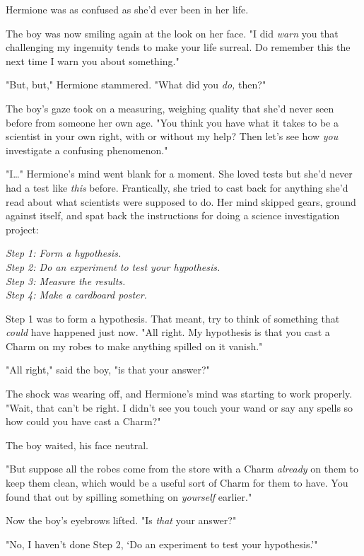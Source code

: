 Hermione was as confused as she'd ever been in her life.

The boy was now smiling again at the look on her face. "I did \emph{warn} you
that challenging my ingenuity tends to make your life surreal. Do remember this
the next time I warn you about something."

"But, but," Hermione stammered. "What did you \emph{do,} then?"

The boy's gaze took on a measuring, weighing quality that she'd never seen
before from someone her own age. "You think you have what it takes to be a
scientist in your own right, with or without my help? Then let's see how
\emph{you} investigate a confusing phenomenon."

"I{\ldots}" Hermione's mind went blank for a moment. She loved tests but she'd
never had a test like \emph{this} before. Frantically, she tried to cast back
for anything she'd read about what scientists were supposed to do. Her mind
skipped gears, ground against itself, and spat back the instructions for doing
a science investigation project:

\emph{Step 1: Form a hypothesis.\\
Step 2: Do an experiment to test your hypothesis.\\
Step 3: Measure the results.\\
Step 4: Make a cardboard poster.}

Step 1 was to form a hypothesis. That meant, try to think of something that
\emph{could} have happened just now. "All right. My hypothesis is that you cast
a Charm on my robes to make anything spilled on it vanish."

"All right," said the boy, "is that your answer?"

The shock was wearing off, and Hermione's mind was starting to work properly.
"Wait, that can't be right. I didn't see you touch your wand or say any spells
so how could you have cast a Charm?"

The boy waited, his face neutral.

"But suppose all the robes come from the store with a Charm \emph{already} on
them to keep them clean, which would be a useful sort of Charm for them to
have. You found that out by spilling something on \emph{yourself} earlier."

Now the boy's eyebrows lifted. "Is \emph{that} your answer?"

"No, I haven't done Step 2, `Do an experiment to test your hypothesis.'"


